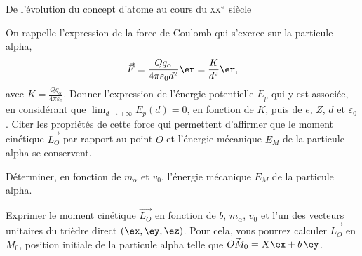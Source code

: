 \begin{exo}[PC][1][devoir]{De l'évolution du concept d'atome au cours du \textsc{xx}$^{\rm e}$ siècle}
\begin{quest}
\item  On rappelle l'expression de la force de Coulomb qui s'exerce sur la particule alpha,
\begin{equation*}
\Vec{F} =\frac{Qq_\alpha}{4\pi\varepsilon_0d^2}\er=\frac{K}{d^2}\er,
\end{equation*}
avec $K=\frac{Qq_\alpha}{4\pi \varepsilon_0}$.
Donner l'expression de l'énergie potentielle $E_{p}$ qui y est associée,
en considérant que $\lim_{d\rightarrow+\infty}E_{p}(d)=0$, en fonction de $K$, puis de $e$, $Z$, $d$ et $\varepsilon_{0}$.
Citer les propriétés de cette force qui permettent d'affirmer que
le moment cinétique $\Vec{L_{O}}$ par rapport au point
$O$ et l'énergie mécanique $E_{M}$ de la particule alpha se conservent.


\item  Déterminer, en fonction de $m_{\alpha}$ et $v_{0}$, l'énergie
mécanique $E_{M}$ de la particule alpha.


\item  Exprimer le moment cinétique $\Vec{L_{O}}$ en fonction
de $b$, $m_{\alpha}$, $v_{0}$ et l'un des vecteurs unitaires du
trièdre direct $(\ex,\ey,\ez)$. Pour cela,
vous pourrez calculer $\Vec{L_{O}}$ en $M_{0}$, position
initiale de la particule alpha telle que $\Vec{OM_{0}}=X\ex+b\,\ey$.
\end{quest}
\end{exo}
